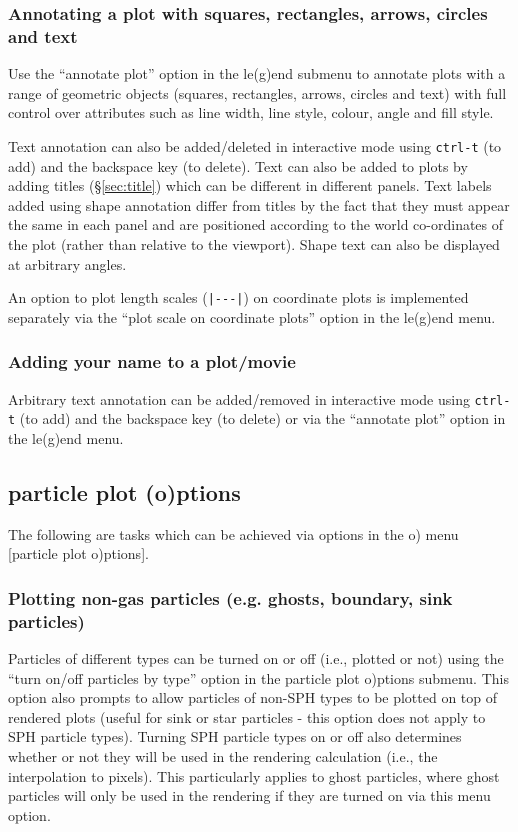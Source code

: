 \documentclass[a4paper,10pt]{article}
\begin{document}
\subsubsection{ Annotating a plot with squares, rectangles, arrows, circles and text}
 Use the ``annotate plot'' option in the le(g)end submenu to annotate plots with a range of geometric objects (squares, rectangles, arrows, circles and text) with full control over attributes such as line width, line style, colour, angle and fill style. 
 
 Text annotation can also be added/deleted in interactive mode using \verb+ctrl-t+ (to add) and the backspace key (to delete). Text can also be added to plots by adding titles (\S\ref{sec:title}) which can be different in different panels. Text labels added using shape annotation differ from titles by the fact that they must appear the same in each panel and are positioned according to the world co-ordinates of the plot (rather than relative to the viewport). Shape text can also be displayed at arbitrary angles.
 
 An option to plot length scales (\verb+|---|+) on coordinate plots is implemented separately via the ``plot scale on coordinate plots'' option in the le(g)end menu.
 
\subsubsection{ Adding your name to a plot/movie}
 Arbitrary text annotation can be added/removed in interactive mode using \verb+ctrl-t+ (to add) and the backspace key (to delete) or via the ``annotate plot'' option in the le(g)end menu.
 
\subsection{particle plot (o)ptions}%
\label{sec:opts}
 The following are tasks which can be achieved via options in the o) menu [particle plot o)ptions].
 
\subsubsection{ Plotting non-gas particles (e.g. ghosts, boundary, sink particles)}
\label{sec:plotparticlesbytype}
 Particles of different types can be turned on or off (i.e., plotted or not) using the ``turn on/off particles by type'' option in the particle plot o)ptions submenu. This option also prompts to allow particles of non-SPH types to be
plotted on top of rendered plots (useful for sink or star particles - this option does not apply to SPH particle types).  Turning SPH particle types on or off also determines whether or not they will be used in the rendering calculation (i.e., the interpolation to pixels). This particularly applies to ghost particles, where ghost particles will only be used in the rendering if they are turned on via this menu option.
\end{document}
